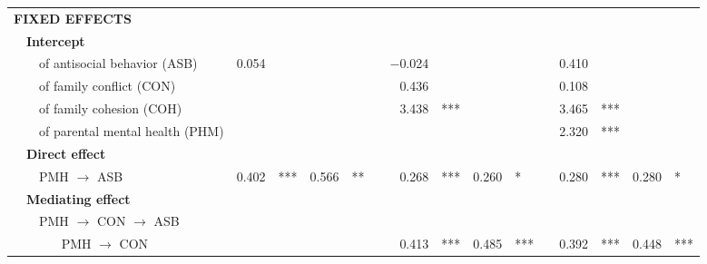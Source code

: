 {\begin{tabular}{llll r@{\hskip -0.1mm}l r@{\hskip -0.1mm}l c r@{\hskip -0.1mm}l r@{\hskip -0.1mm}l c r@{\hskip -0.1mm}l r@{\hskip -0.1mm}l}
      \multicolumn{4}{l}{\textbf{FIXED EFFECTS}} &       &       &       &       &       &       &       &       &       &       &       &       &       &  \\
      & \multicolumn{3}{l}{\textbf{Intercept}} &       &       &       &       &       &       &       &       &       &       &       &       &       &  \\
      &       & \multicolumn{2}{l}{of antisocial behavior (ASB)} & 0.054 &       &       &       &       & $-$0.024 &       &       &       &       & 0.410 &       &       &  \\
      &       & \multicolumn{2}{l}{of family conflict (CON)} &       &       &       &       &       & 0.436 &       &       &       &       & 0.108 &       &       &  \\
      &       & \multicolumn{2}{l}{of family cohesion (COH)} &       &       &       &       &       & 3.438 & ***   &       &       &       & 3.465 & ***   &       &  \\
      &       & \multicolumn{2}{l}{of parental mental health (PHM)} &       &       &       &       &       &       &       &       &       &       & 2.320 & ***   &       &  \\
      & \multicolumn{3}{l}{\textbf{Direct effect}} &       &       &       &       &       &       &       &       &       &       &       &       &       &  \\
      &       & \multicolumn{2}{l}{PMH $\longrightarrow$ ASB} & 0.402 & ***   & 0.566 & **   &       & 0.268 & ***   & 0.260 & *     &       & 0.280 & ***   & 0.280 & * \\
      & \multicolumn{3}{l}{\textbf{Mediating effect}} &       &       &       &       &       &       &       &       &       &       &       &       &       &  \\
      &       & \multicolumn{2}{l}{PMH $\longrightarrow$ CON $\longrightarrow$ ASB} &       &       &       &       &       &       &       &       &       &       &       &       &       &  \\
      &       &       & PMH $\longrightarrow$ CON &       &       &       &       &       & 0.413 & ***   & 0.485 & ***   &       & 0.392 & ***   & 0.448 & *** \\

\end{tabular}}
